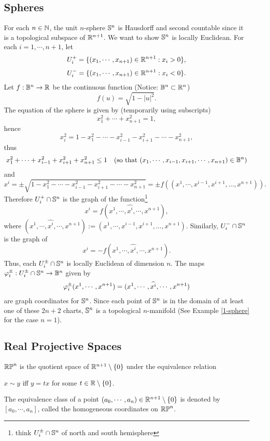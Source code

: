 \subsection*{Spheres}
\begin{example}[~(spheres)]
    For each $n \in \N$, the unit $n$-sphere $\S^n$ is Hausdorff and second countable since it is a topological subspace of $\R^{n+1}$. We want to show $\S^n$ is locally Euclidean. For each $i=1, \cdots, n+1$, let
    $$U_i^+ = \{(x_1, \cdots, x_{n+1}) \in \R^{n+1}: x_i > 0 \}, $$
    $$U_i^- = \{(x_1, \cdots, x_{n+1}) \in \R^{n+1}: x_i < 0 \}. $$
    Let $f: \B^n \to \R$ be the continuous function (Notice: $\B^n \subset \R^n$)
    $$f(u) = \sqrt{1-|u|^2}. $$
    The equation of the sphere is given by (temporarily using subscripts) 
    $$x_1^2 + \cdots + x_{n+1}^2=1, $$
    hence 
    $$x_i^2 = 1-x_1^2-\cdots-x_{i-1}^2-x_{i+1}^2-\cdots-x_{n+1}^2, $$
    thus 
    $$x_1^2 + \cdots + x_{i-1}^2 + x_{i+1}^2 + x_{n+1}^2 \leq 1 
    \quad (\text{so that }(x_1, \cdots, x_{i-1}, x_{i+1}, \cdots, x_{n+1}) \in \B^n) $$ 
    and $$x^i = \pm \sqrt{1-x_1^2-\cdots-x_{i-1}^2-x_{i+1}^2-\cdots-x_{n+1}^2} = \pm f((x^1, \cdots, x^{i-1}, x^{i+1}, \dots, x^{n+1})). $$
    Therefore $U_i^+ \cap \S^n$ is the graph of the function\footnote{think $U_i^\pm \cap \S^n$ of north and south hemisphere}
    $$x^i = f(x^1, \cdots, \hat{x^i}, \cdots, x^{n+1}), $$
    where $(x^1, \cdots, \hat{x^i}, \cdots, x^{n+1}):=
    (x^1, \cdots, x^{i-1}, x^{i+1}, \dots, x^{n+1})$. 
    Similarly, $U_i^- \cap \S^n$ is the graph of 
    $$x^i = -f(x^1, \cdots, \hat{x^i}, \cdots, x^{n+1}). $$
    Thus, each $U_i^\pm \cap \S^n$ is locally Euclidean of dimension $n$. The maps $\phe_i^\pm: U_i^\pm \cap \S^n \to \B^n$ given by 
    $$\phe_i^\pm(x^1, \cdots, x^{n+1}) = (x^1, \cdots, \hat{x^i}, \cdots, x^{n+1})$$
    are graph coordinates for $\S^n$. Since each point of $\S^n$ is in the domain of at least one of these $2n+2$ charts, $\S^n$ is a topological $n$-manifold (See Example \ref{1-sphere} for the case $n=1$).
    
\end{example}
\subsection*{Real Projective Spaces}
$\RP^n$ is the quotient space of $\R^{n+1} \setminus \{0\}$ under the equivalence relation
\begin{center}
    $x \sim y$ iff $y=tx$ for some $t \in \R \setminus \{0\}$.
\end{center}
The equivalence class of a point $(a_0, \cdots, a_n) \in \R^{n+1} \setminus \{0\}$ is denoted by $[a_0, \cdots, a_n]$, called the homogeneous coordinates on $\RP^n$. 

